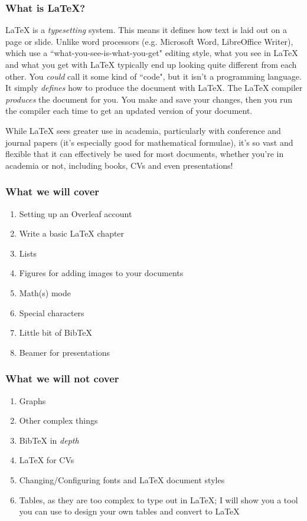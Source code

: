 \documentclass{beamer}
\newcommand{\biggap}{\newline{}\newline{}}
\begin{document}
	\begin{frame}
		\frametitle{What is \LaTeX{?}}
		\LaTeX{} is a \textit{typesetting} system. \pause This means it defines how text is laid out on a page or slide. \pause Unlike word processors (e.g. Microsoft Word, LibreOffice Writer), which use a ``what-you-see-is-what-you-get" editing style, what you see in \LaTeX{} and what you get with \LaTeX{} typically end up looking quite different from each other. \pause You \textit{could} call it some kind of ``code", but it isn't a programming language. \pause It simply \textit{defines} how to produce the document with \LaTeX. \pause The \LaTeX{} compiler \textit{produces} the document for you. You make and save your changes, then you run the compiler each time to get an updated version of your document.\pause\biggap
		
		While \LaTeX{} sees greater use in academia, particularly with conference and journal papers (it's especially good for mathematical formulae), it's so vast and flexible that it can effectively be used for most documents, whether you're in academia or not, including books, CVs and even presentations!
	\end{frame}
	
	\begin{frame}
		\frametitle{What we will cover}
		\begin{enumerate}
			\item<1-> Setting up an Overleaf account
			\item<2-> Write a basic \LaTeX{} chapter
			\item<3-> Lists
			\item<4-> Figures for adding images to your documents
			\item<5-> Math(s) mode
			\item<6-> Special characters
			\item<7-> Little bit of Bib\TeX
			\item<8-> Beamer for presentations
		\end{enumerate}
	\end{frame}
	
	\begin{frame}
		\frametitle{What we will \textbf{not} cover}
		\begin{enumerate}
			\item<1-> Graphs
			\item<2-> Other complex things
			\item<3-> Bib\TeX{} in \textit{depth}
			\item<4-> \LaTeX{} for CVs
			\item<5-> Changing/Configuring fonts and \LaTeX{} document styles
			\item<6-> Tables, as they are too complex to type out in \LaTeX{}; I will show you a tool you can use to design your own tables and convert to \LaTeX{}
		\end{enumerate}
	\end{frame}
	
\end{document}
